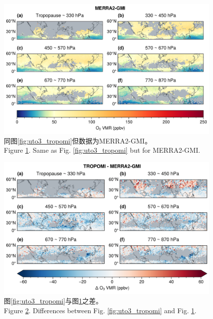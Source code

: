 \begin{figure}[!htbp]
    \centering
    \includegraphics[width=15cm]{./figures/uto3_merra2-gmi.png}
    \caption{
    同图\ref{fig:uto3_tropomi}但数据为MERRA2-GMI。 \\
    Figure \ref{fig:uto3_merra2}. Same as Fig. \ref{fig:uto3_tropomi} but for MERRA2-GMI.
    }
    \label{fig:uto3_merra2}
\end{figure}


\begin{figure}[!htbp]
    \centering
    \includegraphics[width=15cm]{./figures/uto3_delta.png}
    \caption{
    图\ref{fig:uto3_tropomi}与图\ref{fig:uto3_merra2}之差。 \\
    Figure \ref{fig:uto3_delta}. Differences between Fig. \ref{fig:uto3_tropomi} and Fig. \ref{fig:uto3_merra2}.
    }
    \label{fig:uto3_delta}
\end{figure}


